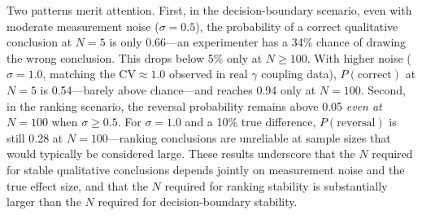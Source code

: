 \documentclass[11pt]{article}
\begin{document}
Two patterns merit attention. First, in the decision-boundary scenario, even with moderate measurement noise ($\sigma{=}0.5$), the probability of a correct qualitative conclusion at $N{=}5$ is only 0.66---an experimenter has a 34\% chance of drawing the wrong conclusion. This drops below 5\% only at $N \geq 100$. With higher noise ($\sigma{=}1.0$, matching the $\text{CV} \approx 1.0$ observed in real $\gamma$ coupling data), $P(\text{correct})$ at $N{=}5$ is 0.54---barely above chance---and reaches 0.94 only at $N{=}100$. Second, in the ranking scenario, the reversal probability remains above 0.05 \emph{even at $N{=}100$} when $\sigma \geq 0.5$. For $\sigma{=}1.0$ and a 10\% true difference, $P(\text{reversal})$ is still 0.28 at $N{=}100$---ranking conclusions are unreliable at sample sizes that would typically be considered large. These results underscore that the $N$ required for stable qualitative conclusions depends jointly on measurement noise and the true effect size, and that the $N$ required for ranking stability is substantially larger than the $N$ required for decision-boundary stability.



\end{document}
